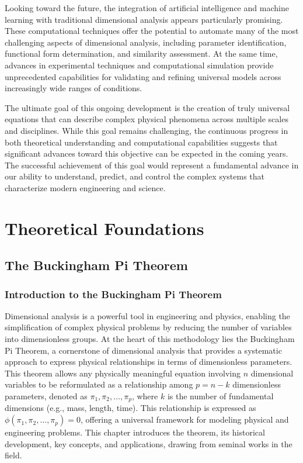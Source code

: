 \documentclass[
	11pt, %
	fleqn, %
	a4paper, %
]{LegrandOrangeBook}
\begin{document}
Looking toward the future, the integration of artificial intelligence and machine learning with traditional dimensional analysis appears particularly promising. These computational techniques offer the potential to automate many of the most challenging aspects of dimensional analysis, including parameter identification, functional form determination, and similarity assessment. At the same time, advances in experimental techniques and computational simulation provide unprecedented capabilities for validating and refining universal models across increasingly wide ranges of conditions.

The ultimate goal of this ongoing development is the creation of truly universal equations that can describe complex physical phenomena across multiple scales and disciplines. While this goal remains challenging, the continuous progress in both theoretical understanding and computational capabilities suggests that significant advances toward this objective can be expected in the coming years. The successful achievement of this goal would represent a fundamental advance in our ability to understand, predict, and control the complex systems that characterize modern engineering and science.


\part{Theoretical Foundations}
\chapter{The Buckingham Pi Theorem}
\label{ch:buckinghamPi}



\section{Introduction to the Buckingham Pi Theorem}
\label{sec:buckinghampi}

Dimensional analysis is a powerful tool in engineering and physics, enabling the simplification of complex physical problems by reducing the number of variables into dimensionless groups. At the heart of this methodology lies the Buckingham Pi Theorem, a cornerstone of dimensional analysis that provides a systematic approach to express physical relationships in terms of dimensionless parameters. This theorem allows any physically meaningful equation involving \( n \) dimensional variables to be reformulated as a relationship among \( p = n - k \) dimensionless parameters, denoted as \(\pi_1, \pi_2, \dots, \pi_p\), where \( k \) is the number of fundamental dimensions (e.g., mass, length, time). This relationship is expressed as \(\phi(\pi_1, \pi_2, \dots, \pi_p) = 0\), offering a universal framework for modeling physical and engineering problems. This chapter introduces the theorem, its historical development, key concepts, and applications, drawing from seminal works in the field.
\end{document}
